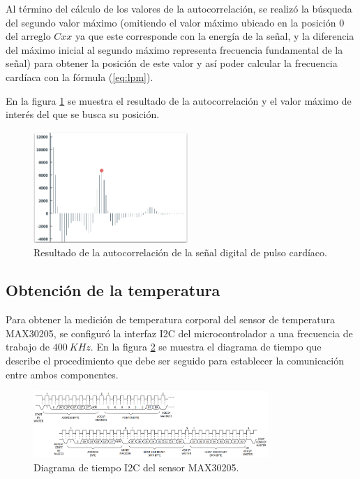 \documentclass[journal]{IEEEtran}
\begin{document}
Al término del cálculo de los valores de la autocorrelación, se realizó la búsqueda del segundo valor máximo (omitiendo el valor máximo ubicado en la posición $0$ del arreglo $Cxx$ ya que este corresponde con la energía de la señal, y la diferencia del máximo inicial al segundo máximo representa frecuencia fundamental de la señal) para obtener la posición de este valor y así poder calcular la frecuencia cardíaca con la fórmula (\ref{eq:lpm}).

En la figura \ref{fig:autocorr} se muestra el resultado de la autocorrelación y el valor máximo de interés del que se busca su posición. \\

\begin{figure}[htbp!]
	\centering
	\includegraphics[width=2.3in]{AvancesPruebas/imagenes/autocorr.png}
	\caption{Resultado de la autocorrelación de la señal digital de pulso cardíaco.}
	\label{fig:autocorr}
\end{figure}

\subsection{Obtención de la temperatura}
Para obtener la medición de temperatura corporal del sensor de temperatura MAX30205, se configuró la interfaz I2C del microcontrolador a una frecuencia de trabajo de $400\ KHz$. En la figura \ref{fig:DiagramaMAX30205} se muestra el diagrama de tiempo que describe el procedimiento que debe ser seguido para establecer la comunicación entre ambos componentes.\\

\begin{figure}[htbp!]
	\centering
	\includegraphics[width=3.5in]{AvancesPruebas/imagenes/diagramaI2C.png}
	\caption{Diagrama de tiempo I2C del sensor MAX30205.}
	\label{fig:DiagramaMAX30205}
\end{figure}
\end{document}
